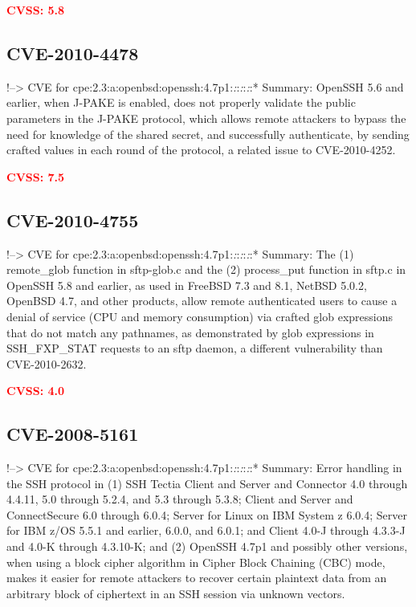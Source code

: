 \documentclass[a4paper, 12pt]{article}
\begin{document}
\textbf{\textcolor{red}{CVSS: 5.8}}

\hypertarget{cve-2010-4478}{%
\subsection{CVE-2010-4478}\label{cve-2010-4478}}

!--\textgreater{} CVE for
cpe:2.3:a:openbsd:openssh:4.7p1:\emph{:}:\emph{:}:\emph{:}:* Summary:
OpenSSH 5.6 and earlier, when J-PAKE is enabled, does not properly
validate the public parameters in the J-PAKE protocol, which allows
remote attackers to bypass the need for knowledge of the shared secret,
and successfully authenticate, by sending crafted values in each round
of the protocol, a related issue to CVE-2010-4252.

\textbf{\textcolor{red}{CVSS: 7.5}}

\hypertarget{cve-2010-4755}{%
\subsection{CVE-2010-4755}\label{cve-2010-4755}}

!--\textgreater{} CVE for
cpe:2.3:a:openbsd:openssh:4.7p1:\emph{:}:\emph{:}:\emph{:}:* Summary:
The (1) remote\_glob function in sftp-glob.c and the (2) process\_put
function in sftp.c in OpenSSH 5.8 and earlier, as used in FreeBSD 7.3
and 8.1, NetBSD 5.0.2, OpenBSD 4.7, and other products, allow remote
authenticated users to cause a denial of service (CPU and memory
consumption) via crafted glob expressions that do not match any
pathnames, as demonstrated by glob expressions in SSH\_FXP\_STAT
requests to an sftp daemon, a different vulnerability than
CVE-2010-2632.

\textbf{\textcolor{red}{CVSS: 4.0}}

\hypertarget{cve-2008-5161}{%
\subsection{CVE-2008-5161}\label{cve-2008-5161}}

!--\textgreater{} CVE for
cpe:2.3:a:openbsd:openssh:4.7p1:\emph{:}:\emph{:}:\emph{:}:* Summary:
Error handling in the SSH protocol in (1) SSH Tectia Client and Server
and Connector 4.0 through 4.4.11, 5.0 through 5.2.4, and 5.3 through
5.3.8; Client and Server and ConnectSecure 6.0 through 6.0.4; Server for
Linux on IBM System z 6.0.4; Server for IBM z/OS 5.5.1 and earlier,
6.0.0, and 6.0.1; and Client 4.0-J through 4.3.3-J and 4.0-K through
4.3.10-K; and (2) OpenSSH 4.7p1 and possibly other versions, when using
a block cipher algorithm in Cipher Block Chaining (CBC) mode, makes it
easier for remote attackers to recover certain plaintext data from an
arbitrary block of ciphertext in an SSH session via unknown vectors.
\end{document}
